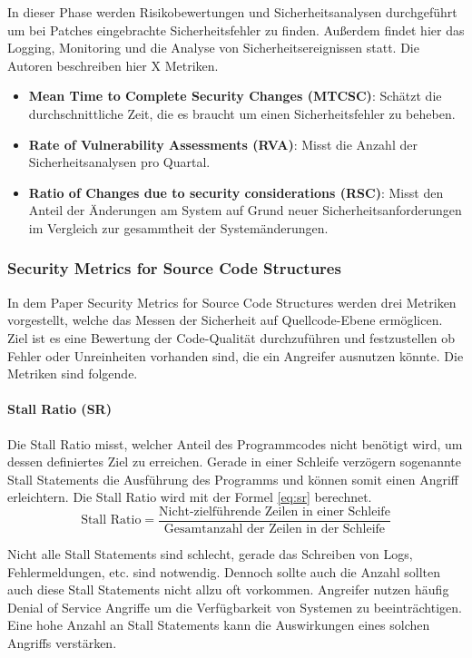 \documentclass[12pt, a4paper, ngerman]{article}
\begin{document}
In dieser Phase werden Risikobewertungen und Sicherheitsanalysen durchgeführt um bei Patches eingebrachte Sicherheitsfehler zu finden.
Außerdem findet hier das Logging, Monitoring und die Analyse von Sicherheitsereignissen statt.
Die Autoren beschreiben hier X Metriken.
\begin{itemize}
  \item \textbf{Mean Time to Complete Security Changes (MTCSC)}: Schätzt die durchschnittliche Zeit, die es braucht um einen Sicherheitsfehler zu beheben. 
  \item \textbf{Rate of Vulnerability Assessments (RVA)}: Misst die Anzahl der Sicherheitsanalysen pro Quartal.
  \item \textbf{Ratio of Changes due to security considerations (RSC)}: Misst den Anteil der Änderungen am System auf Grund neuer Sicherheitsanforderungen im Vergleich zur gesammtheit der Systemänderungen.
\end{itemize}

\subsubsection{Security Metrics for Source Code Structures~\cite{Chowdhury_Chan_Zulkernine_2008}}

In dem Paper Security Metrics for Source Code Structures werden drei Metriken vorgestellt, 
welche das Messen der Sicherheit auf Quellcode-Ebene ermöglicen.
Ziel ist es eine Bewertung der Code-Qualität durchzuführen und 
festzustellen ob Fehler oder Unreinheiten vorhanden sind, die ein Angreifer ausnutzen könnte.
Die Metriken sind folgende.

\paragraph{Stall Ratio (SR)}

Die Stall Ratio misst, welcher Anteil des Programmcodes nicht benötigt wird, um dessen definiertes Ziel zu erreichen.
Gerade in einer Schleife verzögern sogenannte Stall Statements die Ausführung des Programms und können somit einen Angriff erleichtern.
Die Stall Ratio wird mit der Formel \ref{eq:sr} berechnet.
\begin{equation} \label{eq:sr}
  \text{Stall Ratio} = \frac{ \text{Nicht-zielführende Zeilen in einer Schleife} }{ \text{Gesamtanzahl der Zeilen in der Schleife} }
\end{equation}

Nicht alle Stall Statements sind schlecht, gerade das Schreiben von Logs, Fehlermeldungen, etc. sind notwendig.
Dennoch sollte auch die Anzahl sollten auch diese Stall Statements nicht allzu oft vorkommen.
Angreifer nutzen häufig Denial of Service Angriffe um die Verfügbarkeit von Systemen zu beeinträchtigen.
Eine hohe Anzahl an Stall Statements kann die Auswirkungen eines solchen Angriffs verstärken.
\end{document}
